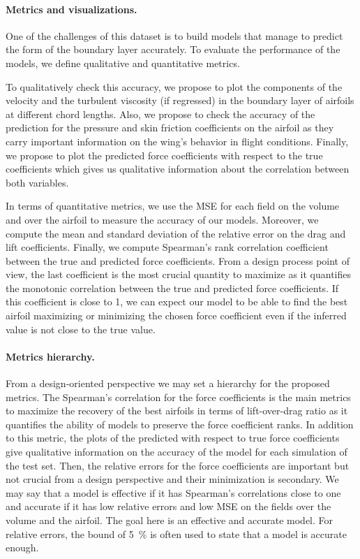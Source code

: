\paragraph{Metrics and visualizations.} One of the challenges of this dataset is to build models that manage to predict the form of the boundary layer accurately. To evaluate the performance of the models, we define qualitative and quantitative metrics.

To qualitatively check this accuracy, we propose to plot the components of the velocity and the turbulent viscosity (if regressed) in the boundary layer of airfoils at different chord lengths. Also, we propose to check the accuracy of the prediction for the pressure and skin friction coefficients on the airfoil as they carry important information on the wing's behavior in flight conditions. Finally, we propose to plot the predicted force coefficients with respect to the true coefficients which gives us qualitative information about the correlation between both variables. 

In terms of quantitative metrics, we use the \acrshort{MSE} for each field on the volume and over the airfoil to measure the accuracy of our models. Moreover, we compute the mean and standard deviation of the relative error on the drag and lift coefficients. Finally, we compute Spearman's rank correlation coefficient between the true and predicted force coefficients. From a design process point of view, the last coefficient is the most crucial quantity to maximize as it quantifies the monotonic correlation between the true and predicted force coefficients. If this coefficient is close to 1, we can expect our model to be able to find the best airfoil maximizing or minimizing the chosen force coefficient even if the inferred value is not close to the true value.

\paragraph{Metrics hierarchy.} From a design-oriented perspective we may set a hierarchy for the proposed metrics. The Spearman's correlation for the force coefficients is the main metrics to maximize the recovery of the best airfoils in terms of lift-over-drag ratio as it quantifies the ability of models to preserve the force coefficient ranks. In addition to this metric, the plots of the predicted with respect to true force coefficients give qualitative information on the accuracy of the model for each simulation of the test set. Then, the relative errors for the force coefficients are important but not crucial from a design perspective and their minimization is secondary. We may say that a model is effective if it has Spearman's correlations close to one and accurate if it has low relative errors and low \acrshort{MSE} on the fields over the volume and the airfoil. The goal here is an effective and accurate model. For relative errors, the bound of \SI{5}{\percent} is often used to state that a model is accurate enough.

